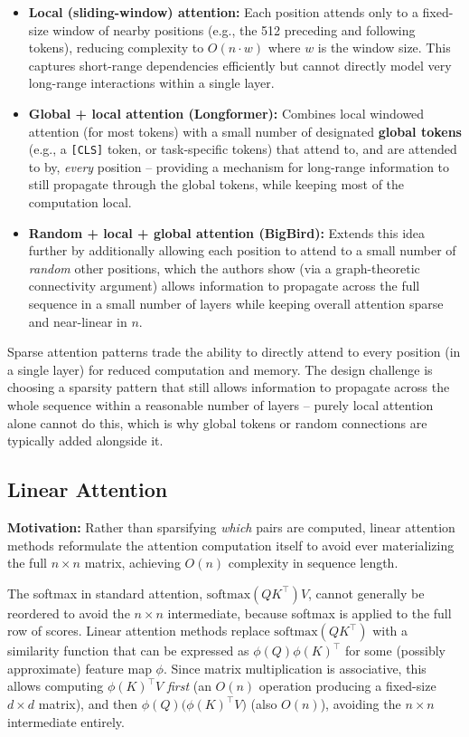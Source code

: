 \documentclass[11pt]{article}
\begin{document}
\begin{itemize}[leftmargin=1.5em]
    \item \textbf{Local (sliding-window) attention:} Each position attends only to a fixed-size window of nearby positions (e.g., the 512 preceding and following tokens), reducing complexity to $O(n \cdot w)$ where $w$ is the window size. This captures short-range dependencies efficiently but cannot directly model very long-range interactions within a single layer.
    \item \textbf{Global + local attention (Longformer):} Combines local windowed attention (for most tokens) with a small number of designated \textbf{global tokens} (e.g., a \texttt{[CLS]} token, or task-specific tokens) that attend to, and are attended to by, \emph{every} position -- providing a mechanism for long-range information to still propagate through the global tokens, while keeping most of the computation local.
    \item \textbf{Random + local + global attention (BigBird):} Extends this idea further by additionally allowing each position to attend to a small number of \emph{random} other positions, which the authors show (via a graph-theoretic connectivity argument) allows information to propagate across the full sequence in a small number of layers while keeping overall attention sparse and near-linear in $n$.
\end{itemize}

\begin{keyidea}
Sparse attention patterns trade the ability to directly attend to every position (in a single layer) for reduced computation and memory. The design challenge is choosing a sparsity pattern that still allows information to propagate across the whole sequence within a reasonable number of layers -- purely local attention alone cannot do this, which is why global tokens or random connections are typically added alongside it.
\end{keyidea}

\subsection*{Linear Attention}

\textbf{Motivation:} Rather than sparsifying \emph{which} pairs are computed, linear attention methods reformulate the attention computation itself to avoid ever materializing the full $n\times n$ matrix, achieving $O(n)$ complexity in sequence length.

\begin{keyidea}
The softmax in standard attention, $\text{softmax}(QK^\top)V$, cannot generally be reordered to avoid the $n\times n$ intermediate, because softmax is applied to the full row of scores. Linear attention methods replace $\text{softmax}(QK^\top)$ with a similarity function that can be expressed as $\phi(Q)\phi(K)^\top$ for some (possibly approximate) feature map $\phi$. Since matrix multiplication is associative, this allows computing $\phi(K)^\top V$ \emph{first} (an $O(n)$ operation producing a fixed-size $d\times d$ matrix), and then $\phi(Q) \big(\phi(K)^\top V\big)$ (also $O(n)$), avoiding the $n\times n$ intermediate entirely.
\end{keyidea}
\end{document}
